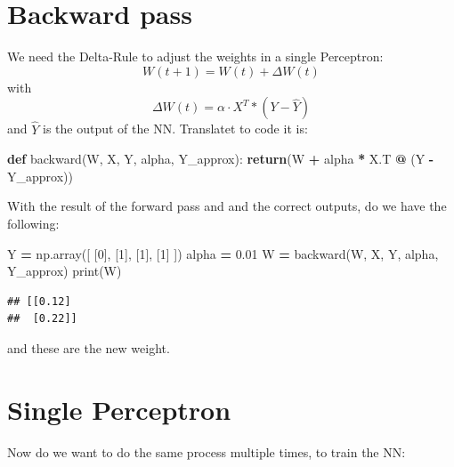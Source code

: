 \documentclass[
]{book}
\newenvironment{Shaded}{\begin{snugshade}}{\end{snugshade}}
\newcommand{\BuiltInTok}[1]{#1}
\newcommand{\ControlFlowTok}[1]{\textcolor[rgb]{0.13,0.29,0.53}{\textbf{#1}}}
\newcommand{\DecValTok}[1]{\textcolor[rgb]{0.00,0.00,0.81}{#1}}
\newcommand{\FloatTok}[1]{\textcolor[rgb]{0.00,0.00,0.81}{#1}}
\newcommand{\KeywordTok}[1]{\textcolor[rgb]{0.13,0.29,0.53}{\textbf{#1}}}
\newcommand{\NormalTok}[1]{#1}
\newcommand{\OperatorTok}[1]{\textcolor[rgb]{0.81,0.36,0.00}{\textbf{#1}}}
\begin{document}
\hypertarget{backward-pass}{%
\section{Backward pass}\label{backward-pass}}

We need the Delta-Rule to adjust the weights in a single Perceptron:
\[
  W(t+1) = W(t) + \Delta W(t)
\]
with
\[
  \Delta W(t) = \alpha \cdot X^{T} * (Y - \hat{Y})
\]
and \(\hat{Y}\) is the output of the NN. Translatet to code it is:

\begin{Shaded}
\begin{Highlighting}[]
\KeywordTok{def}\NormalTok{ backward(W, X, Y, alpha, Y\_approx):}
    \ControlFlowTok{return}\NormalTok{(W }\OperatorTok{+}\NormalTok{ alpha }\OperatorTok{*}\NormalTok{ X.T }\OperatorTok{@}\NormalTok{ (Y }\OperatorTok{{-}}\NormalTok{ Y\_approx))}
\end{Highlighting}
\end{Shaded}

With the result of the forward pass and and the correct outputs, do we have the following:

\begin{Shaded}
\begin{Highlighting}[]
\NormalTok{Y }\OperatorTok{=}\NormalTok{ np.array([}
\NormalTok{  [}\DecValTok{0}\NormalTok{],}
\NormalTok{  [}\DecValTok{1}\NormalTok{],}
\NormalTok{  [}\DecValTok{1}\NormalTok{],}
\NormalTok{  [}\DecValTok{1}\NormalTok{]}
\NormalTok{])}
\NormalTok{alpha }\OperatorTok{=} \FloatTok{0.01}
\NormalTok{W }\OperatorTok{=}\NormalTok{ backward(W, X, Y, alpha, Y\_approx)}
\BuiltInTok{print}\NormalTok{(W)}
\end{Highlighting}
\end{Shaded}

\begin{verbatim}
## [[0.12]
##  [0.22]]
\end{verbatim}

and these are the new weight.

\hypertarget{single-perceptron-1}{%
\section{Single Perceptron}\label{single-perceptron-1}}

Now do we want to do the same process multiple times, to train the NN:
\end{document}
